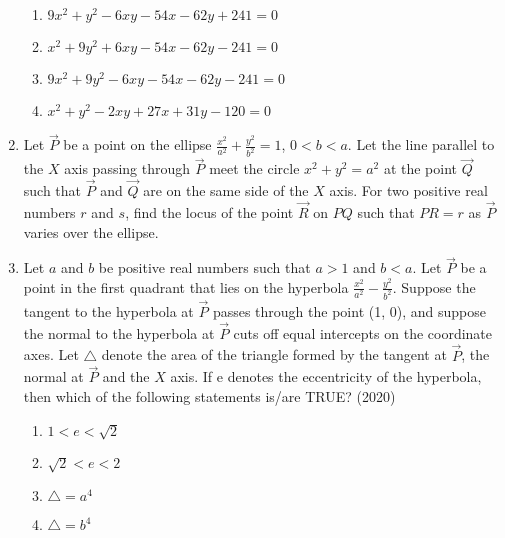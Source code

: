 \begin{enumerate}[label=\thesubsection.\arabic*.,ref=\thesubsection.\theenumi]
	\begin{multicols}{2}
\begin{enumerate}
     \item $9x^2+y^2-6xy-54x-62y+241=0$
     \item $x^2+9y^2+6xy-54x-62y-241=0$
     \item $9x^2+9y^2-6xy-54x-62y-241=0$
     \item $x^2+y^2-2xy+27x+31y-120=0$
\end{enumerate}\end{multicols}
\item Let $\vec{P}$ be a point on the ellipse $\frac{x^2}{a^2}+\frac{y^2}{b^2}=1$, $0<b<a$. Let the line parallel to the $X$ axis passing through $\vec{P}$ meet the circle $x^2+y^2=a^2$ at the point $\vec{Q}$ such that $\vec{P}$ and $\vec{Q}$ are on the same side of the $X$ axis. For two positive real numbers $r$ and $s$, find the locus of the point $\vec{R}$ on $PQ$ such that $PR
= r$ as $\vec{P}$ varies over the ellipse. \hfill{}
 \item Let $a$ and $b$ be positive real numbers such that $a > 1$ and $b < a$. Let $\vec{P}$ be a point in the first quadrant that lies on the hyperbola $\frac{x^2}{a^2} - \frac{y^2}{b^2}$. Suppose the tangent to the hyperbola at $\vec{P}$ passes through the point (1, 0), and suppose the normal to the hyperbola at $\vec{P}$ cuts off equal intercepts on the coordinate axes. Let $\triangle$ denote the area of the triangle formed by the tangent at $\vec{P}$, the normal at $\vec{P}$ and the $X$ axis. If e denotes the eccentricity of the hyperbola, then which of the following statements is/are TRUE?
\hfill (2020)
\begin{enumerate}	
 \item $1< e <\sqrt{2}$
 \item $\sqrt{2}< e <2$
 \item $\triangle = a^4$
 \item $\triangle = b^4$
\end{enumerate}	

	\end{enumerate}
